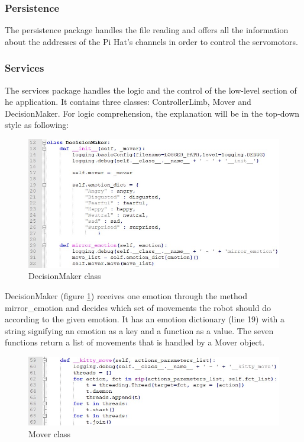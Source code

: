\documentclass[runningheads,a4paper,12pt]{report}
\begin{document}
\subsubsection{Persistence}
The persistence package handles the file reading and offers all the information about the addresses of the Pi Hat's channels in order to control the servomotors. 

\subsubsection{Services}
The services package handles the logic and the control of the low-level section of he application. It contains three classes: ControllerLimb, Mover and DecisionMaker. For logic comprehension, the explanation will be in the top-down style as following: 

\begin{figure}
	\centering

  	\includegraphics[width=\linewidth]{./images/3_decision_maker}\hfill

    \caption{DecisionMaker class}  
    \label{fig:decision-maker}
\end{figure}

DecisionMaker (figure \ref{fig:decision-maker}) receives one emotion through the method mirror\_emotion and decides which set of movements the robot should do according to the given emotion. It has an emotion dictionary (line 19) with a string signifying an emotion as a key and  a function as a value. The seven functions return a list of movements that is handled by a Mover object. 

\begin{figure}
	\centering

  	\includegraphics[width=\linewidth]{./images/3_mover}\hfill

    \caption{Mover class}  
    \label{fig:mover}
\end{figure}
\end{document}
